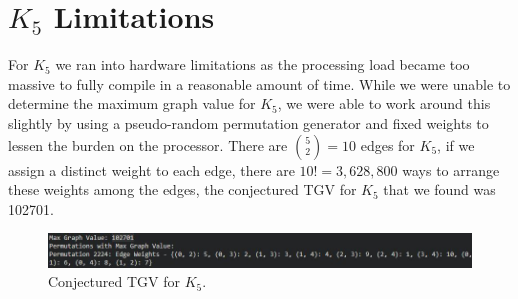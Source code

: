 \documentclass[12pt,letterpaper]{article}
\begin{document}
\section{$K_{5}$ Limitations}

For $K_{5}$ we ran into hardware limitations as the processing load became too massive to fully compile in a reasonable amount of time. While we were unable to determine the maximum graph value for $K_{5}$, we were able to work around this slightly by using a pseudo-random permutation generator and fixed weights to lessen the burden on the processor. There are $\binom{5}{2} = 10$ edges for $K_{5}$, if we assign a distinct weight to each edge, there are 
$10!=3,628,800$ ways to arrange these weights among the edges, the conjectured TGV for $K_{5}$ that we found was 102701.
\begin{figure}[hbt!]  
    \begin{center}
    \includegraphics[width=6in]{f4.111}
    \caption{\label{last} Conjectured TGV for $K_{5}$.}
    \end{center}
\end{figure}

\newpage \listoffigures 
\end{document}
